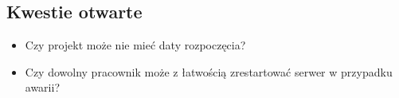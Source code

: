 \documentclass{article}
\begin{document}
\subsection{Kwestie otwarte}
\begin{itemize}
    \item Czy projekt może nie mieć daty rozpoczęcia?
    \item Czy dowolny pracownik może z łatwością zrestartować serwer w przypadku awarii?
\end{itemize}
\end{document}

